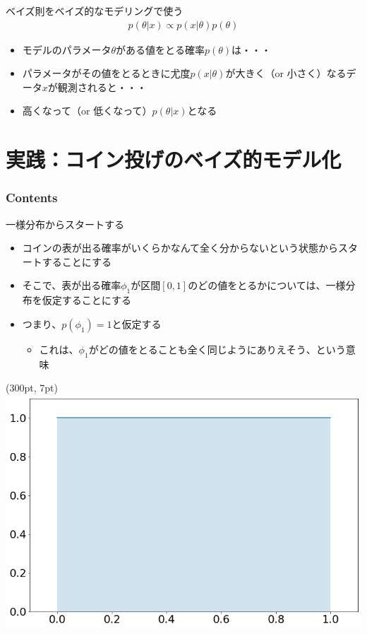 \documentclass[aspectratio=169,unicode,dvipdfmx,14pt]{beamer}
\begin{document}
\begin{frame}{ベイズ則をベイズ的なモデリングで使う}
\vspace{-.4in}
{\Large
\begin{align}
p(\theta|x) \propto p(x|\theta)p(\theta)
\end{align}
}%
\vspace{-.2in}
\begin{itemize}
\item モデルのパラメータ$\theta$がある値をとる確率$p(\theta)$は・・・
\item パラメータがその値をとるときに尤度$p(x|\theta)$が大きく（or 小さく）なるデータ$x$が観測されると・・・
\item 高くなって（or 低くなって）$p(\theta|x)$となる
\end{itemize}
\end{frame}

\section{実践：コイン投げのベイズ的モデル化}

\begin{frame}\frametitle{Contents}
\Large \tableofcontents[currentsection]
\end{frame}

\begin{frame}{一様分布からスタートする}
\begin{itemize}
\item コインの表が出る確率がいくらかなんて全く分からないという状態からスタートすることにする
\item そこで、表が出る確率$\phi_1$が区間$[0,1]$のどの値をとるかについては、一様分布を仮定することにする
\item つまり、$p(\phi_1)=1$と仮定する
\begin{itemize}
\item これは、$\phi_1$がどの値をとることも全く同じようにありえそう、という意味
\end{itemize}
\end{itemize}
\begin{textblock*}{0.4\linewidth}(300pt, 7pt)
    \centering
    \includegraphics[width=0.5\linewidth]{uniform_dist.png}
\end{textblock*}
\end{frame}
\end{document}
